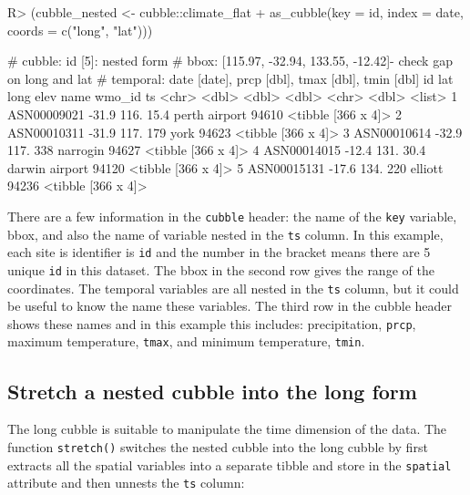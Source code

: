 \documentclass[
]{jss}
\begin{document}
\begin{CodeChunk}
\begin{CodeInput}
R> (cubble_nested <- cubble::climate_flat %
+   as_cubble(key = id, index = date, coords = c("long", "lat")))
\end{CodeInput}
\begin{CodeOutput}
# cubble:   id [5]: nested form
# bbox:     [115.97, -32.94, 133.55, -12.42]- check gap on long and lat
# temporal: date [date], prcp [dbl], tmax [dbl], tmin [dbl]
  id            lat  long  elev name           wmo_id ts                
  <chr>       <dbl> <dbl> <dbl> <chr>           <dbl> <list>            
1 ASN00009021 -31.9  116.  15.4 perth airport   94610 <tibble [366 x 4]>
2 ASN00010311 -31.9  117. 179   york            94623 <tibble [366 x 4]>
3 ASN00010614 -32.9  117. 338   narrogin        94627 <tibble [366 x 4]>
4 ASN00014015 -12.4  131.  30.4 darwin airport  94120 <tibble [366 x 4]>
5 ASN00015131 -17.6  134. 220   elliott         94236 <tibble [366 x 4]>
\end{CodeOutput}
\end{CodeChunk}

There are a few information in the \texttt{cubble} header: the name of
the \texttt{key} variable, bbox, and also the name of variable nested in
the \texttt{ts} column. In this example, each site is identifier is
\texttt{id} and the number in the bracket means there are 5 unique
\texttt{id} in this dataset. The bbox in the second row gives the range
of the coordinates. The temporal variables are all nested in the
\texttt{ts} column, but it could be useful to know the name these
variables. The third row in the cubble header shows these names and in
this example this includes: precipitation, \texttt{prcp}, maximum
temperature, \texttt{tmax}, and minimum temperature, \texttt{tmin}.

\hypertarget{stretch-a-nested-cubble-into-the-long-form}{%
\subsection{Stretch a nested cubble into the long
form}\label{stretch-a-nested-cubble-into-the-long-form}}

The long cubble is suitable to manipulate the time dimension of the
data. The function \texttt{stretch()} switches the nested cubble into
the long cubble by first extracts all the spatial variables into a
separate tibble and store in the \texttt{spatial} attribute and then
unnests the \texttt{ts} column:
\end{document}
